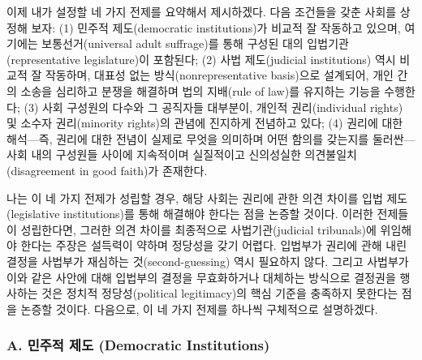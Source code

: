 \documentclass[a4paper,12pt,oneside]{article}  %
\begin{document}
이제 내가 설정할 네 가지 전제를 요약해서 제시하겠다. 다음 조건들을 갖춘
사회를 상정해 보자: (1) 민주적 제도(democratic institutions)가 비교적 잘
작동하고 있으며, 여기에는 보통선거(universal adult suffrage)를 통해
구성된 대의 입법기관(representative legislature)이 포함된다; (2) 사법
제도(judicial institutions) 역시 비교적 잘 작동하며, 대표성 없는
방식(nonrepresentative basis)으로 설계되어, 개인 간의 소송을 심리하고
분쟁을 해결하며 법의 지배(rule of law)를 유지하는 기능을 수행한다; (3)
사회 구성원의 다수와 그 공직자들 대부분이, 개인적 권리(individual
rights) 및 소수자 권리(minority rights)의 관념에 진지하게 전념하고 있다;
(4) 권리에 대한 해석---즉, 권리에 대한 전념이 실제로 무엇을 의미하며
어떤 함의를 갖는지를 둘러싼---사회 내의 구성원들 사이에 지속적이며
실질적이고 신의성실한 의견불일치(disagreement in good faith)가 존재한다.

나는 이 네 가지 전제가 성립할 경우, 해당 사회는 권리에 관한 의견 차이를
입법 제도(legislative institutions)를 통해 해결해야 한다는 점을 논증할
것이다. 이러한 전제들이 성립한다면, 그러한 의견 차이를 최종적으로
사법기관(judicial tribunals)에 위임해야 한다는 주장은 설득력이 약하며
정당성을 갖기 어렵다. 입법부가 권리에 관해 내린 결정을 사법부가 재심하는
것(second-guessing) 역시 필요하지 않다. 그리고 사법부가 이와 같은 사안에
대해 입법부의 결정을 무효화하거나 대체하는 방식으로 결정권을 행사하는
것은 정치적 정당성(political legitimacy)의 핵심 기준을 충족하지 못한다는
점을 논증할 것이다. 다음으로, 이 네 가지 전제를 하나씩 구체적으로
설명하겠다.

\subsubsection{A. 민주적 제도 (Democratic
Institutions)}\label{a.-uxbbfcuxc8fcuxc801-uxc81cuxb3c4-democratic-institutions}
\end{document}
